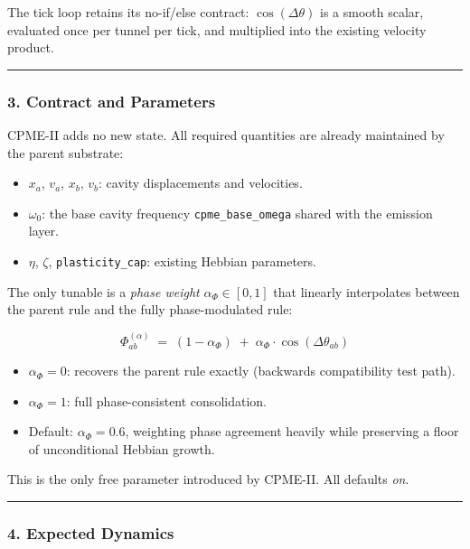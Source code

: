 \documentclass[
  11pt,
  a4paper,
]{article}
\providecommand{\tightlist}{%
  \setlength{\itemsep}{0pt}\setlength{\parskip}{0pt}}
\begin{document}
The tick loop retains its no-if/else contract: \(\cos(\Delta \theta)\)
is a smooth scalar, evaluated once per tunnel per tick, and multiplied
into the existing velocity product.

\begin{center}\rule{0.5\linewidth}{0.5pt}\end{center}

\subsubsection{3. Contract and
Parameters}\label{contract-and-parameters}

CPME-II adds no new state. All required quantities are already
maintained by the parent substrate:

\begin{itemize}
\tightlist
\item
  \(x_a\), \(v_a\), \(x_b\), \(v_b\): cavity displacements and
  velocities.
\item
  \(\omega_0\): the base cavity frequency \texttt{cpme\_base\_omega}
  shared with the emission layer.
\item
  \(\eta\), \(\zeta\), \texttt{plasticity\_cap}: existing Hebbian
  parameters.
\end{itemize}

The only tunable is a \emph{phase weight} \(\alpha_\Phi \in [0, 1]\)
that linearly interpolates between the parent rule and the fully
phase-modulated rule:

\[
\Phi_{ab}^{(\alpha)} \;=\; (1 - \alpha_\Phi) \;+\; \alpha_\Phi \cdot \cos(\Delta \theta_{ab})
\]

\begin{itemize}
\tightlist
\item
  \(\alpha_\Phi = 0\): recovers the parent rule exactly (backwards
  compatibility test path).
\item
  \(\alpha_\Phi = 1\): full phase-consistent consolidation.
\item
  Default: \(\alpha_\Phi = 0.6\), weighting phase agreement heavily
  while preserving a floor of unconditional Hebbian growth.
\end{itemize}

This is the only free parameter introduced by CPME-II. All defaults
\emph{on}.

\begin{center}\rule{0.5\linewidth}{0.5pt}\end{center}

\subsubsection{4. Expected Dynamics}\label{expected-dynamics-2}
\end{document}
